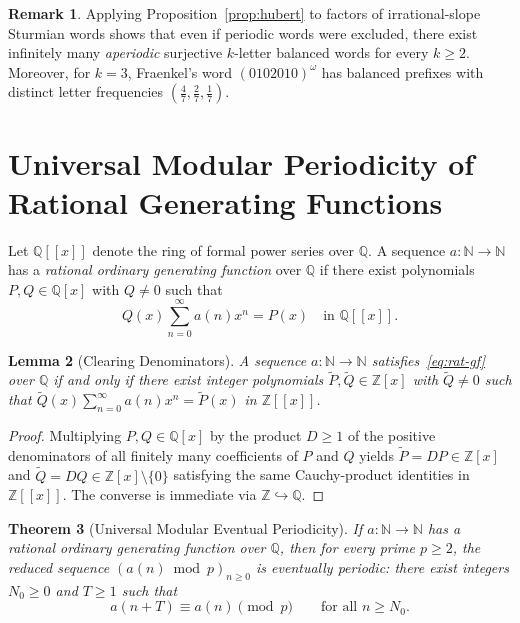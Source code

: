\documentclass[11pt,a4paper]{article}
\newtheorem{theorem}{Theorem}[section]
\newtheorem{lemma}[theorem]{Lemma}
\theoremstyle{definition}
\newtheorem{remark}[theorem]{Remark}
\newcommand{\N}{\mathbb{N}}
\newcommand{\Z}{\mathbb{Z}}
\newcommand{\Q}{\mathbb{Q}}
\begin{document}
\begin{remark}
Applying Proposition~\ref{prop:hubert} to factors of irrational-slope Sturmian words shows that even if periodic words were excluded, there exist infinitely many \emph{aperiodic} surjective $k$-letter balanced words for every $k \ge 2$. Moreover, for $k = 3$, Fraenkel's word $(0102010)^\omega$ has balanced prefixes with distinct letter frequencies $(\frac{4}{7}, \frac{2}{7}, \frac{1}{7})$.
\end{remark}

\section{Universal Modular Periodicity of Rational Generating Functions}

Let $\Q[[x]]$ denote the ring of formal power series over $\Q$. A sequence $a : \N \to \N$ has a \emph{rational ordinary generating function} over $\Q$ if there exist polynomials $P, Q \in \Q[x]$ with $Q \neq 0$ such that
\begin{equation}
\label{eq:rat-gf}
  Q(x) \sum_{n=0}^{\infty} a(n) x^n = P(x) \quad \text{in } \Q[[x]].
\end{equation}

\begin{lemma}[Clearing Denominators]
\label{lem:clear-den}
A sequence $a : \N \to \N$ satisfies~\eqref{eq:rat-gf} over $\Q$ if and only if there exist integer polynomials $\widetilde{P}, \widetilde{Q} \in \Z[x]$ with $\widetilde{Q} \neq 0$ such that $\widetilde{Q}(x) \sum_{n=0}^\infty a(n)x^n = \widetilde{P}(x)$ in $\Z[[x]]$.
\end{lemma}

\begin{proof}
Multiplying $P, Q \in \Q[x]$ by the product $D \ge 1$ of the positive denominators of all finitely many coefficients of $P$ and $Q$ yields $\widetilde{P} = D P \in \Z[x]$ and $\widetilde{Q} = D Q \in \Z[x] \setminus \{0\}$ satisfying the same Cauchy-product identities in $\Z[[x]]$. The converse is immediate via $\Z \hookrightarrow \Q$.
\end{proof}

\begin{theorem}[Universal Modular Eventual Periodicity]
\label{thm:mod-per}
If $a : \N \to \N$ has a rational ordinary generating function over $\Q$, then for \emph{every} prime $p \ge 2$, the reduced sequence $(a(n) \bmod p)_{n \ge 0}$ is eventually periodic: there exist integers $N_0 \ge 0$ and $T \ge 1$ such that
\[
  a(n + T) \equiv a(n) \pmod p \qquad \text{for all } n \ge N_0.
\]
\end{theorem}
\end{document}
